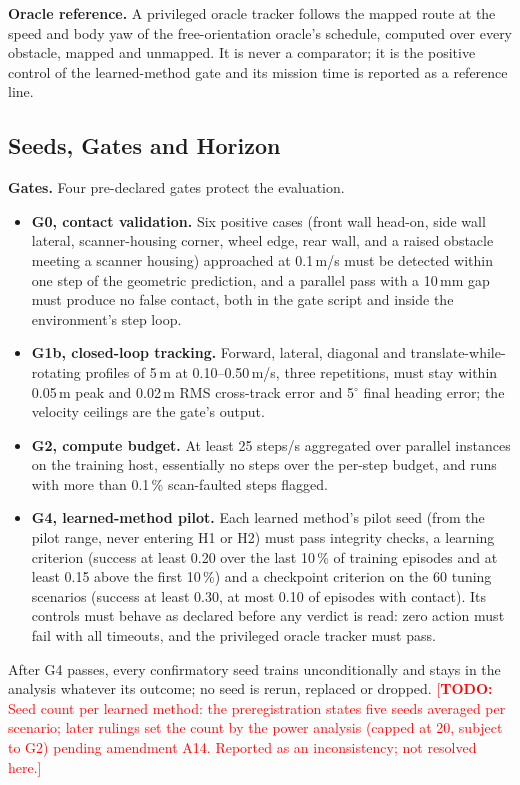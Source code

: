 \documentclass[sensors,article,submit,moreauthors]{Definitions/mdpi}
\newcommand{\todo}[1]{\textcolor{red}{[\textbf{TODO:} #1]}}
\begin{document}
\textbf{Oracle reference.} A privileged oracle tracker follows the mapped route at the speed and body yaw of the free-orientation oracle's schedule, computed over every obstacle, mapped and unmapped. It is never a comparator; it is the positive control of the learned-method gate and its mission time is reported as a reference line.

\subsection{Seeds, Gates and Horizon}\label{sec:seeds}

\textbf{Gates.} Four pre-declared gates protect the evaluation.
\begin{itemize}
\item \textbf{G0, contact validation.} Six positive cases (front wall head-on, side wall lateral, scanner-housing corner, wheel edge, rear wall, and a raised obstacle meeting a scanner housing) approached at 0.1\,m/s must be detected within one step of the geometric prediction, and a parallel pass with a 10\,mm gap must produce no false contact, both in the gate script and inside the environment's step loop.
\item \textbf{G1b, closed-loop tracking.} Forward, lateral, diagonal and translate-while-rotating profiles of 5\,m at 0.10--0.50\,m/s, three repetitions, must stay within 0.05\,m peak and 0.02\,m RMS cross-track error and 5$^\circ$ final heading error; the velocity ceilings are the gate's output.
\item \textbf{G2, compute budget.} At least 25 steps/s aggregated over parallel instances on the training host, essentially no steps over the per-step budget, and runs with more than 0.1\,\% scan-faulted steps flagged.
\item \textbf{G4, learned-method pilot.} Each learned method's pilot seed (from the pilot range, never entering H1 or H2) must pass integrity checks, a learning criterion (success at least 0.20 over the last 10\,\% of training episodes and at least 0.15 above the first 10\,\%) and a checkpoint criterion on the 60 tuning scenarios (success at least 0.30, at most 0.10 of episodes with contact). Its controls must behave as declared before any verdict is read: zero action must fail with all timeouts, and the privileged oracle tracker must pass.
\end{itemize}
After G4 passes, every confirmatory seed trains unconditionally and stays in the analysis whatever its outcome; no seed is rerun, replaced or dropped. \todo{Seed count per learned method: the preregistration states five seeds averaged per scenario; later rulings set the count by the power analysis (capped at 20, subject to G2) pending amendment A14. Reported as an inconsistency; not resolved here.}
\end{document}
